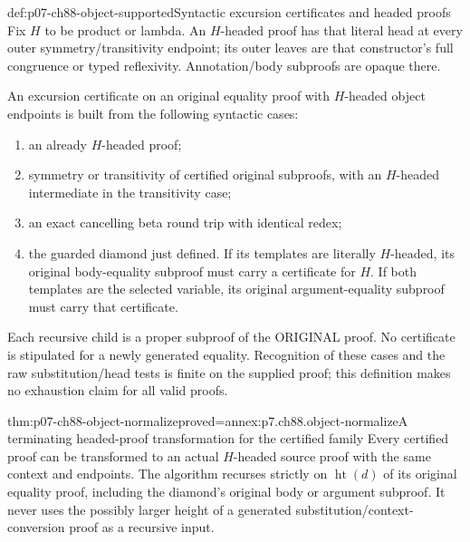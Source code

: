 \begin{hbdefinition}{def:p07-ch88-object-supported}{Syntactic excursion certificates and headed proofs}
Fix \(H\) to be product or lambda. An \(H\)-headed proof has that
literal head at every outer symmetry/transitivity endpoint; its outer
leaves are that constructor's full congruence or typed reflexivity.
Annotation/body subproofs are opaque there.

An excursion certificate on an original equality proof with \(H\)-headed
object endpoints is built from the following syntactic cases:
\begin{enumerate}
\item an already \(H\)-headed proof;
\item symmetry or transitivity of certified original subproofs, with an
      \(H\)-headed intermediate in the transitivity case;
\item an exact cancelling beta round trip with identical redex;
\item the guarded diamond just defined. If its templates are literally
      \(H\)-headed, its original body-equality subproof must carry a
      certificate for \(H\). If both templates are the selected variable,
      its original argument-equality subproof must carry that certificate.
\end{enumerate}
Each recursive child is a proper subproof of the ORIGINAL proof. No
certificate is stipulated for a newly generated equality. Recognition of
these cases and the raw substitution/head tests is finite on the supplied
proof; this definition makes no exhaustion claim for all valid proofs.
\end{hbdefinition}

\begin{hbtheorem}{thm:p07-ch88-object-normalize}{proved=annex:p7.ch88.object-normalize}{A terminating headed-proof transformation for the certified family}
Every certified proof can be transformed to an actual \(H\)-headed
source proof with the same context and endpoints. The algorithm recurses
strictly on \(\operatorname{ht}(d)\) of its original equality proof,
including the diamond's original body or argument subproof. It never
uses the possibly larger height of a generated substitution/context-
conversion proof as a recursive input.
\end{hbtheorem}

